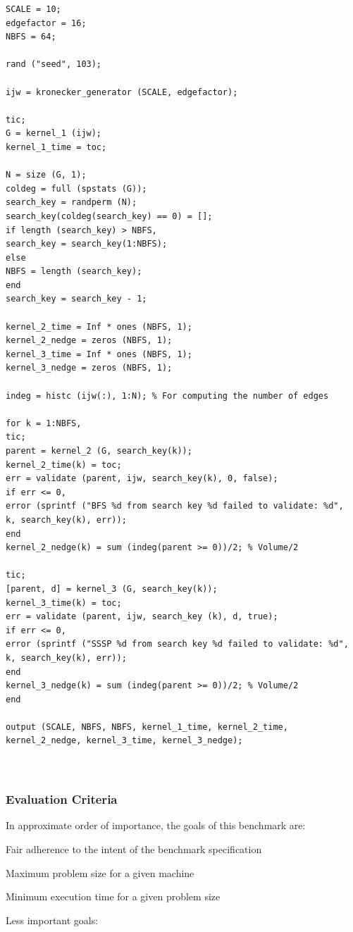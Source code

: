 \documentclass{article}
\begin{document}
\begin{lstlisting}
SCALE = 10;
edgefactor = 16;
NBFS = 64;

rand ("seed", 103);

ijw = kronecker_generator (SCALE, edgefactor);

tic;
G = kernel_1 (ijw);
kernel_1_time = toc;

N = size (G, 1);
coldeg = full (spstats (G));
search_key = randperm (N);
search_key(coldeg(search_key) == 0) = [];
if length (search_key) > NBFS,
search_key = search_key(1:NBFS);
else
NBFS = length (search_key);
end
search_key = search_key - 1;

kernel_2_time = Inf * ones (NBFS, 1);
kernel_2_nedge = zeros (NBFS, 1);
kernel_3_time = Inf * ones (NBFS, 1);
kernel_3_nedge = zeros (NBFS, 1);

indeg = histc (ijw(:), 1:N); % For computing the number of edges

for k = 1:NBFS,
tic;
parent = kernel_2 (G, search_key(k));
kernel_2_time(k) = toc;
err = validate (parent, ijw, search_key(k), 0, false);
if err <= 0,
error (sprintf ("BFS %d from search key %d failed to validate: %d",
k, search_key(k), err));
end
kernel_2_nedge(k) = sum (indeg(parent >= 0))/2; % Volume/2

tic;
[parent, d] = kernel_3 (G, search_key(k));
kernel_3_time(k) = toc;
err = validate (parent, ijw, search_key (k), d, true);
if err <= 0,
error (sprintf ("SSSP %d from search key %d failed to validate: %d",
k, search_key(k), err));
end
kernel_3_nedge(k) = sum (indeg(parent >= 0))/2; % Volume/2
end

output (SCALE, NBFS, NBFS, kernel_1_time, kernel_2_time, kernel_2_nedge, kernel_3_time, kernel_3_nedge);



\end{lstlisting}

\subsubsection*{Evaluation Criteria}

In approximate order of importance, the goals of this benchmark are:

Fair adherence to the intent of the benchmark specification

Maximum problem size for a given machine

Minimum execution time for a given problem size

Less important goals:
\end{document}
